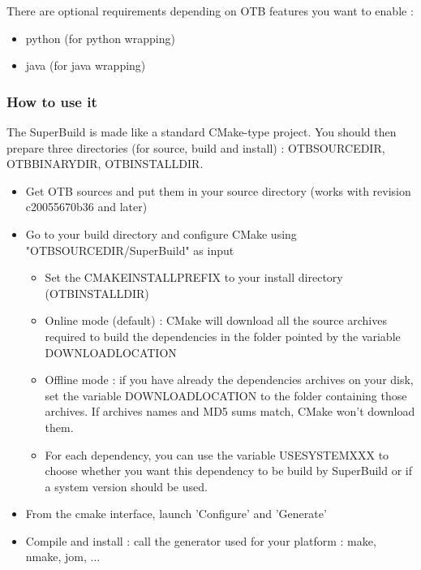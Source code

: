 There are optional requirements depending on OTB features you want to enable :
\begin{itemize}
	\item python (for python wrapping)
    \item java (for java wrapping) 
\end{itemize}

\subsubsection{How to use it}

The SuperBuild is made like a standard CMake-type project. You should then prepare three directories (for source, build and install) :
OTB\textunderscore SOURCE\textunderscore DIR, OTB\textunderscore BINARY\textunderscore DIR, OTB\textunderscore INSTALL\textunderscore DIR.

\begin{itemize}
	\item Get OTB sources and put them in your source directory (works with revision c20055670b36 and later)
    \item Go to your build directory and configure CMake using "OTB\textunderscore SOURCE\textunderscore DIR/SuperBuild" as input
    \begin{itemize}
        \item Set the CMAKE\textunderscore INSTALL\textunderscore PREFIX to your install directory (OTB\textunderscore INSTALL\textunderscore DIR)
        \item Online mode (default) : CMake will download all the source archives required to build the dependencies in the folder pointed by the variable DOWNLOAD\textunderscore LOCATION
        \item Offline mode : if you have already the dependencies archives on your disk, set the variable DOWNLOAD\textunderscore LOCATION to the folder containing those archives. If archives names and MD5 sums match, CMake won't download them.
        \item For each dependency, you can use the variable USE\textunderscore SYSTEM\textunderscore XXX to choose whether you want this dependency to be build by SuperBuild or if a system version should be used. 
    \end{itemize}
    \item From the cmake interface, launch 'Configure' and 'Generate'
    \item Compile and install : call the generator used for your platform : make, nmake, jom, ... 
\end{itemize}

